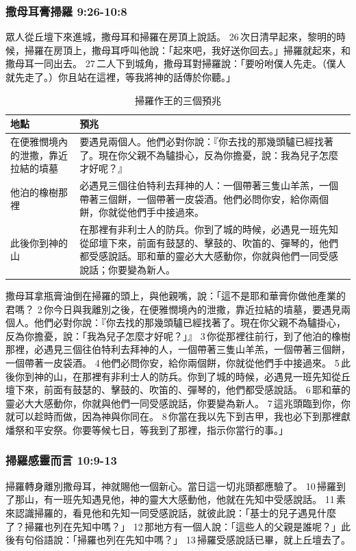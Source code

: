 \subsubsection{撒母耳膏掃羅 9:26-10:8}
眾人從丘壇下來進城，撒母耳和掃羅在房頂上說話。 26 次日清早起來，黎明的時候，掃羅在房頂上，撒母耳呼叫他說：「起來吧，我好送你回去。」掃羅就起來，和撒母耳一同出去。 27 二人下到城角，撒母耳對掃羅說：「要吩咐僕人先走。（僕人就先走了。）你且站在這裡，等我將神的話傳於你聽。」
\begin{table}[H]
\centering 
\begin{tabular}{|p{3cm}|p{13cm}|}
\hline
\hline
地點 & 預兆\\\hline\hline
在便雅憫境內的泄撒，靠近拉結的墳墓 &要遇見兩個人。他們必對你說：『你去找的那幾頭驢已經找著了。現在你父親不為驢掛心，反為你擔憂，說：我為兒子怎麼才好呢？』 \\\hline
他泊的橡樹那裡 &必遇見三個往伯特利去拜神的人：一個帶著三隻山羊羔，一個帶著三個餅，一個帶著一皮袋酒。他們必問你安，給你兩個餅，你就從他們手中接過來。\\\hline
 此後你到神的山&在那裡有非利士人的防兵。你到了城的時候，必遇見一班先知從邱壇下來，前面有鼓瑟的、擊鼓的、吹笛的、彈琴的，他們都受感說話。耶和華的靈必大大感動你，你就與他們一同受感說話；你要變為新人。\\\hline
\end{tabular}
\caption{掃羅作王的三個預兆}
\end{table}


撒母耳拿瓶膏油倒在掃羅的頭上，與他親嘴，說：「這不是耶和華膏你做他產業的君嗎？ 2 你今日與我離別之後，在便雅憫境內的泄撒，靠近拉結的墳墓，要遇見兩個人。他們必對你說：『你去找的那幾頭驢已經找著了。現在你父親不為驢掛心，反為你擔憂，說：「我為兒子怎麼才好呢？」』 3 你從那裡往前行，到了他泊的橡樹那裡，必遇見三個往伯特利去拜神的人，一個帶著三隻山羊羔，一個帶著三個餅，一個帶著一皮袋酒。 4 他們必問你安，給你兩個餅，你就從他們手中接過來。 5 此後你到神的山，在那裡有非利士人的防兵。你到了城的時候，必遇見一班先知從丘壇下來，前面有鼓瑟的、擊鼓的、吹笛的、彈琴的，他們都受感說話。 6 耶和華的靈必大大感動你，你就與他們一同受感說話，你要變為新人。 7 這兆頭臨到你，你就可以趁時而做，因為神與你同在。 8 你當在我以先下到吉甲，我也必下到那裡獻燔祭和平安祭。你要等候七日，等我到了那裡，指示你當行的事。」

\subsubsection{掃羅感靈而言 10:9-13}
掃羅轉身離別撒母耳，神就賜他一個新心。當日這一切兆頭都應驗了。 10 掃羅到了那山，有一班先知遇見他，神的靈大大感動他，他就在先知中受感說話。 11 素來認識掃羅的，看見他和先知一同受感說話，就彼此說：「基士的兒子遇見什麼了？掃羅也列在先知中嗎？」 12 那地方有一個人說：「這些人的父親是誰呢？」此後有句俗語說：「掃羅也列在先知中嗎？」 13 掃羅受感說話已畢，就上丘壇去了。


